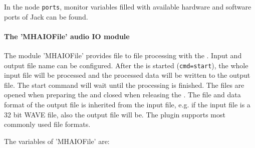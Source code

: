 In the node \verb!ports!, monitor variables filled with available
hardware and software ports of Jack can be found.


\paragraph{The 'MHAIOFile' audio IO module}%
%
%
%
%
\label{sec:MHAIOFile}%

The module 'MHAIOFile' provides file to file processing with the
\mha{}. Input and output file name can be configured. After the \mhad{}
is started (\verb!cmd=start!), the whole input file will be
processed and the processed data will be written to the output
file. The start command will wait until the processing is finished.
The files are opened when preparing the \mhad{} and closed when
releasing the \mhad{}. The file and data format of the output file
is inherited from the input file, e.g. if the input file is a 32 bit
WAVE file, also the output file will be. The plugin supports most
commonly used file formats.

The variables of 'MHAIOFile' are:

\begin{description}
\end{description}

